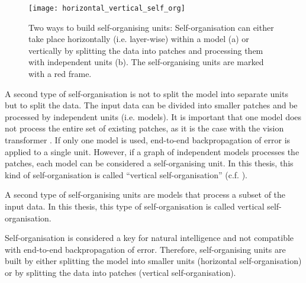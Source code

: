 \begin{figure}[h]
    \centering
    \texttt{[image: horizontal\_vertical\_self\_org]}
     \caption[Overview of horizontal and vertical self-organisation]{Two ways to build self-organising units: Self-organisation can either take place horizontally (i.e. layer-wise) within a model (a) or vertically by splitting the data into patches and processing them with independent units (b). The self-organising units are marked with a red frame.}
\end{figure}
 
A second type of self-organisation is not to split the model into separate units but to split the data.
The input data can be divided into smaller patches and be processed by independent units (i.e. models).
It is important that one model does not process the entire set of existing patches, as it is the case with the vision transformer . If only one model is used, end-to-end backpropagation of error is applied to a single unit.
However, if a graph of independent models processes the patches, each model can be considered a self-organising unit.
In this thesis, this kind of self-organisation is called  ``vertical self-organisation'' (c.f.  ).

\begin{implementation}
	A second type of self-organising units are models that process a subset of the input data. In this thesis, this type of self-organisation is called vertical self-organisation.
\end{implementation}

Self-organisation is considered a key for natural intelligence and not compatible with end-to-end backpropagation of error. Therefore, self-organising units are built by either splitting the model into smaller units (horizontal self-organisation) or by splitting the data into patches (vertical self-organisation).

